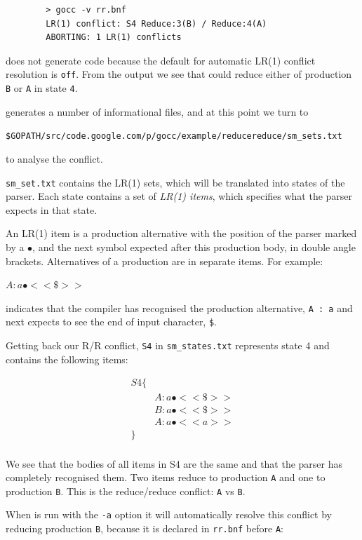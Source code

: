 \documentclass[12pt]{article}
\begin{document}
	\begin{verbatim}
		> gocc -v rr.bnf
		LR(1) conflict: S4 Reduce:3(B) / Reduce:4(A)
		ABORTING: 1 LR(1) conflicts
	\end{verbatim}

	\gocc does not generate code because the default for automatic LR(1) conflict resolution is \verb|off|. From the output we see that \gocc could reduce either of production \verb|B| or \verb|A| in state \verb|4|.

	\gocc generates a number of informational files, and at this point we turn to 

	\verb|$GOPATH/src/code.google.com/p/gocc/example/reducereduce/sm_sets.txt|

	to analyse the conflict.

	\verb|sm_set.txt| contains the LR(1) sets, which will be translated into states of the parser. Each state contains a set of {\em LR(1)  items}, which specifies what the parser expects in that state. 

	An LR(1) item is a production alternative with the position of the parser marked by a $\bullet$, and the next symbol expected after this production body, in double angle brackets. Alternatives of a production are in  separate items. For example: 

	$A : a\bullet <<\$>>$

	indicates that the compiler has recognised the production alternative, \verb|A : a| and  next expects to see the end of input character, \verb|$|.

	Getting back our R/R conflict, \verb|S4|  in \verb|sm_states.txt| represents state 4 and contains the following items:

	\[
		\begin{array}{ll}
			S4 \{ \\
			    & A : a\bullet  <<\$>> \\
			    & B : a\bullet  <<\$>> \\
			    & A : a\bullet  <<a>> \\
			\} \\
		\end{array}
	\]

	We see that the bodies of all items in S4 are the same and that the parser has completely recognised them. Two items reduce to production \verb|A| and one to production \verb|B|. This is the reduce/reduce conflict: \verb|A| vs \verb|B|.

	When \gocc is run with the \verb|-a| option it will automatically resolve this conflict by reducing production \verb|B|, because it is declared in \verb|rr.bnf| before \verb|A|:
\end{document}
